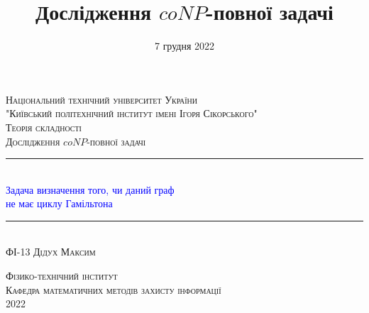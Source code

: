 \documentclass[14pt]{article}
\begin{document}
\begin{spacing}{1.175}	
	\begin{titlepage} 
		\newcommand{\HRule}{\rule{\linewidth}{0.3mm}}
		\center 
		
		\textsc{\large Національний технічний університет України
			\\"Київський політехнічний інститут імені Ігоря Сікорського"}\\[1.5cm]
		
		\vspace{5cm}
		\textsc{\large Теорія складності}\\[0.5cm]
		
		\textsc{\large Дослідження \(coNP\)-повної задачі}\\[0.5cm] 
		
		\HRule\\[0.4cm]
		
		{\huge \textcolor{blue}{Задача визначення того, чи даний граф\\
            не має циклу Гамільтона}}\\[0.4cm]
		
		\HRule\\[1.5cm]
		\textsc{\large ФІ-13 Дідух Максим}\\[0.5cm]
		
		\vspace{7.5cm}
		
		\textsc{\large Фізико-технічний інститут}\\[0.5cm]
		\textsc{\large Кафедра математичних методів захисту інформації}\\[0.5cm]
		{\large {2022}} 
	\end{titlepage}
    
    \newpage
    \title{\Large Дослідження \(coNP\)-повної задачі}
    \date{\large 7 грудня 2022}
    \maketitle
    \tableofcontents                                                                            %
    \newpage

\end{spacing}
\end{document}
